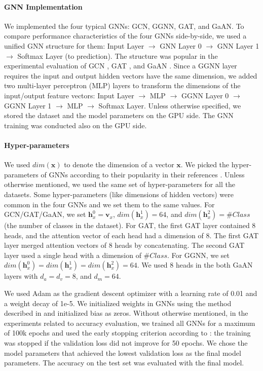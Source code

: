 \paragraph{GNN Implementation}
We implemented the four typical GNNs: GCN, GGNN, GAT, and GaAN.
To compare performance characteristics of the four GNNs side-by-side, we used a unified GNN structure for them: Input Layer $\rightarrow$ GNN Layer 0 $\rightarrow$ GNN Layer 1 $\rightarrow$ Softmax Layer (to prediction).
The structure was popular in the experimental evaluation of GCN \cite{kipf2017_gcn}, GAT \cite{huang2018_gat}, and GaAN \cite{zhang2018_gaan}.
Since a GGNN layer requires the input and output hidden vectors have the same dimension, we added two multi-layer perceptron (MLP) layers to transform the dimensions of the input/output feature vectors: Input Layer $\rightarrow$ MLP $\rightarrow$ GGNN Layer 0 $\rightarrow$ GGNN Layer 1 $\rightarrow$ MLP $\rightarrow$ Softmax Layer.
Unless otherwise specified, we stored the dataset and the model parameters on the GPU side.
The GNN training was conducted also on the GPU side.

\paragraph{Hyper-parameters}
\label{sec:hyper-parameters}

We used $dim(\boldsymbol{x})$ to denote the dimension of a vector $\boldsymbol{x}$.
%
We picked the hyper-parameters of GNNs according to their popularity in their references \cite{kipf2017_gcn, li2015_ggnn, huang2018_gat, zhang2018_gaan}.
%
Unless otherwise mentioned, we used the same set of hyper-parameters for all the datasets. 
%
Some hyper-parameters (like dimensions of hidden vectors) were common in the four GNNs and we set them to the same values.
%
For GCN/GAT/GaAN, we set $\boldsymbol{h}^0_x = \boldsymbol{v}_x$, $dim(\boldsymbol{h}^1_x)=64$, and $dim(\boldsymbol{h}^2_x)=\#Class$ (the number of classes in the dataset).
%
For GAT, the first GAT layer contained 8 heads, and the attention vector of each head had a dimension of 8.
%
The first GAT layer merged attention vectors of 8 heads by concatenating.
%
The second GAT layer used a single head with a dimension of $\#Class$.
%
For GGNN, we set $dim(\boldsymbol{h}^0_x) = dim(\boldsymbol{h}^1_x) = dim(\boldsymbol{h}^2_x) = 64$.
%
We used 8 heads in the both GaAN layers with $d_a=d_v=8$, and $d_m=64$.

We used Adam \cite{diederik2015_adam} as the gradient descent optimizer with a learning rate of 0.01 and a weight decay of 1e-5.
%
We initialized weights in GNNs using the method described in \cite{xavier2010_glorot} and initialized bias as zeros.
%
Without otherwise mentioned, in the experiments related to accuracy evaluation, we trained all GNNs for a maximum of 100k epochs and used the early stopping criterion according to \cite{shchur2018_pitfall_of_gnn}:
%
the training was stopped if the validation loss did not improve for 50 epochs.
%
We chose the model parameters that achieved the lowest validation loss as the final model parameters.
%
The accuracy on the test set was evaluated with the final model.

